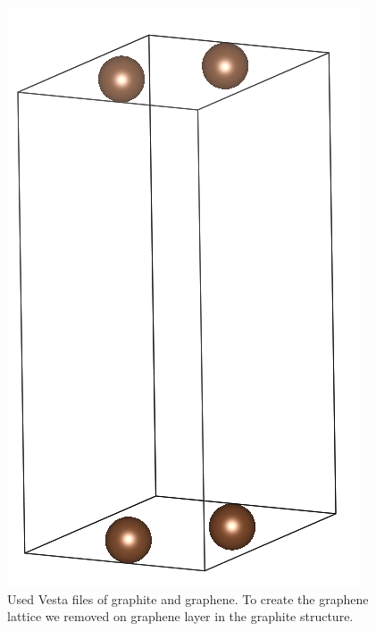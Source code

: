\begin{figure}
\begin{minipage}[t]{0.2\textwidth}
					\includegraphics[width=\textwidth,  angle=0]{Results/Figures/graphene.png}
				\end{minipage}
				\caption{Used Vesta files of graphite and graphene. To create the graphene lattice we removed on graphene layer in the graphite structure.}
				 \label{fig:graphiteGrapheneUnitCells}
			\end{figure}
